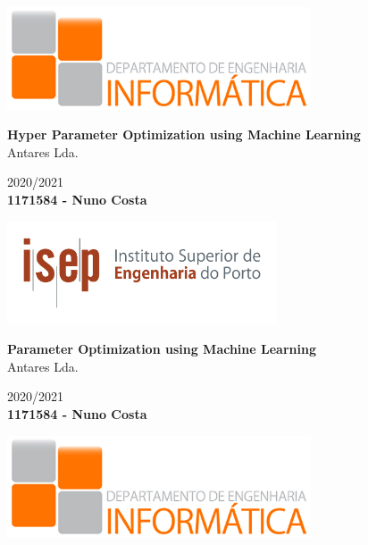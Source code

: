 \documentclass[10pt,titlepage]{article}
\makeatletter
\newcommand\frontmatter{%
    \cleardoublepage
  \pagenumbering{roman}}
\makeatother
\begin{document}
\frontmatter
\begin{titlepage}
   \begin{center}
        \vspace*{1cm}

        \includegraphics[width=8.9916cm]{DEI_logo.png}

        \vfill
        \textbf{\huge Hyper Parameter Optimization using Machine Learning}
        \vspace{0.3cm}
        \\{\large Antares Lda.}
	    \vspace{0.7cm}
        
        {\Large 2020/2021}
        \vspace{1.6cm}
        \\\textbf{\large 1171584 - Nuno Costa}

        \vfill

        \includegraphics[width=8.001cm]{ISEP_logo.png}

    \newpage

       \vspace*{1cm}

        \textbf{\huge Parameter Optimization using Machine Learning}
        \vspace{0.5cm}
        \\{\large Antares Lda.}
        \vspace{1cm}
        
        {\Large 2020/2021}
        \vspace{1.6cm}
        \\\textbf{\large 1171584 - Nuno Costa}

        \vfill

        \includegraphics[width=8.9916cm]{DEI_logo.png}


\end{center}
\end{titlepage}
\end{document}
